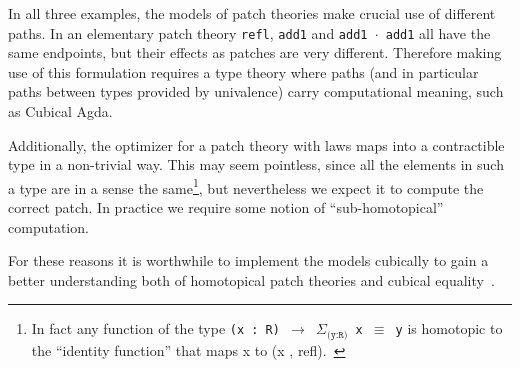 In all three examples, the models of patch theories make crucial use of
different paths. In an elementary patch theory \texttt{refl}, \texttt{add1} and
\texttt{add1 $\cdot$ add1} all have the same endpoints, but their effects as
patches are very different. Therefore making use of this formulation requires a
type theory where paths (and in particular paths between types provided by univalence) carry
computational meaning, such as Cubical Agda.

Additionally, the optimizer for a patch theory with laws maps into a
contractible type in a non-trivial way. This may seem pointless, since all the
elements in such a type are in a sense the same\footnote{In fact any
  function of the type \texttt{(x : R) $\rightarrow$ $\Sigma_\texttt{(y:R)}$ x
  $\equiv$ y} is homotopic to the ``identity function'' that maps x to (x ,
refl).~\cite{Angiuli2016}}, but nevertheless we expect it to compute the correct
patch. In practice we require some notion of ``sub-homotopical'' computation.

For these reasons it is worthwhile to implement the models cubically to gain a
better understanding both of homotopical patch theories and cubical
equality~\cite{vezzosi2021cubical, Angiuli2016}.




